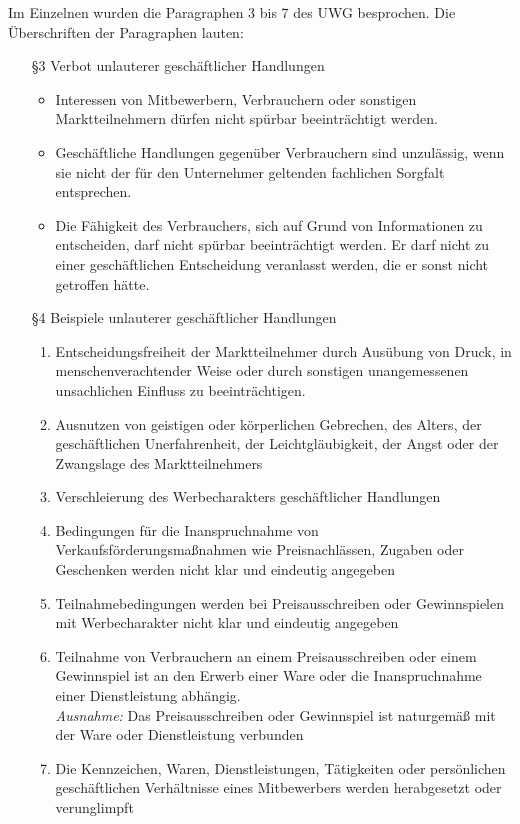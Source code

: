 Im Einzelnen wurden die Paragraphen 3 bis 7 des UWG besprochen. Die Überschriften der Paragraphen lauten:
\begin{itemize}
	\item[§3] Verbot unlauterer geschäftlicher Handlungen
			\begin{itemize}
				\item Interessen von Mitbewerbern, Verbrauchern oder sonstigen Marktteilnehmern dürfen nicht spürbar beeinträchtigt werden.
				\item Geschäftliche Handlungen gegenüber Verbrauchern sind unzulässig, wenn sie nicht der für den Unternehmer geltenden fachlichen Sorgfalt entsprechen.
				\item Die Fähigkeit des Verbrauchers, sich auf Grund von Informationen zu entscheiden, darf nicht spürbar beeinträchtigt werden. Er darf nicht zu einer geschäftlichen Entscheidung veranlasst werden, die er sonst nicht getroffen hätte.
			\end{itemize}
	\item[§4] Beispiele unlauterer geschäftlicher Handlungen
			\begin{enumerate}
				\item Entscheidungsfreiheit der Marktteilnehmer durch Ausübung von Druck, in menschenverachtender Weise oder durch sonstigen unangemessenen unsachlichen Einfluss zu beeinträchtigen.
				\item Ausnutzen von geistigen oder körperlichen Gebrechen, des Alters, der geschäftlichen Unerfahrenheit, der Leichtgläubigkeit, der Angst oder der Zwangslage des Marktteilnehmers
				\item Verschleierung des Werbecharakters geschäftlicher Handlungen
				\item Bedingungen für die Inanspruchnahme von Verkaufsförderungsmaßnahmen wie Preisnachlässen, Zugaben oder Geschenken werden nicht klar und eindeutig angegeben
				\item Teilnahmebedingungen werden bei Preisausschreiben oder Gewinnspielen mit Werbecharakter nicht klar und eindeutig angegeben
				\item Teilnahme von Verbrauchern an einem Preisausschreiben oder einem Gewinnspiel ist an den Erwerb einer Ware oder die Inanspruchnahme einer Dienstleistung abhängig. \\
{\it Ausnahme:} Das Preisausschreiben oder Gewinnspiel ist naturgemäß mit der Ware oder Dienstleistung verbunden
				\item Die Kennzeichen, Waren, Dienstleistungen, Tätigkeiten oder persönlichen geschäftlichen Verhältnisse eines Mitbewerbers werden herabgesetzt oder verunglimpft			

\end{enumerate}
\end{itemize}
